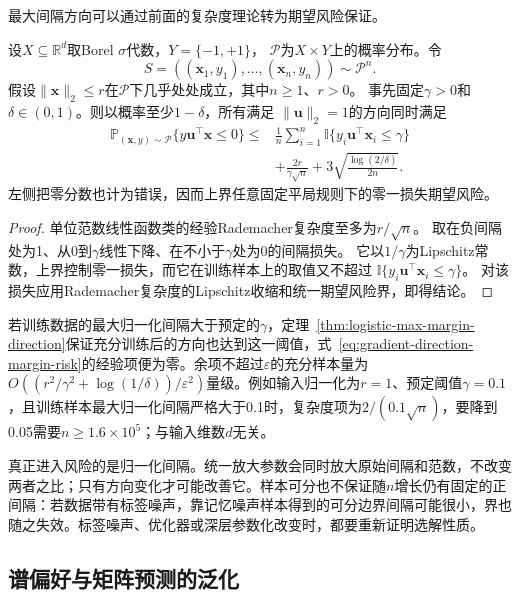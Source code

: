 最大间隔方向可以通过前面的复杂度理论转为期望风险保证。
\begin{theorem}[基于最大间隔的分类期望风险]
\label{thm:max-margin-classification-risk}
设$X\subseteq\mathbb R^d$取Borel $\sigma$代数，$Y=\{-1,+1\}$，
$\mathcal P$为$X\times Y$上的概率分布。令
\[
 S=((\bm x_1,y_1),\ldots,(\bm x_n,y_n))\sim\mathcal P^n.
\]
假设$\|\bm x\|_2\leq r$在$\mathcal P$下几乎处处成立，其中$n\geq1$、$r>0$。
事先固定$\gamma>0$和$\delta\in(0,1)$。则以概率至少$1-\delta$，所有满足
$\|\bm u\|_2=1$的方向同时满足
\begin{equation}
 \begin{aligned}
 \mathbb P_{(\bm x,y)\sim\mathcal P}\{y\bm u^\top\bm x\leq0\}
 \leq{}&\frac1n\sum_{i=1}^n
       \mathbb I\{y_i\bm u^\top\bm x_i\leq\gamma\}\\
 &+\frac{2r}{\gamma\sqrt n}
       +3\sqrt{\frac{\log(2/\delta)}{2n}}.
 \end{aligned}
 \label{eq:gradient-direction-margin-risk}
\end{equation}
左侧把零分数也计为错误，因而上界任意固定平局规则下的零一损失期望风险。
\end{theorem}
\begin{proof}
单位范数线性函数类的经验Rademacher复杂度至多为$r/\sqrt n$。
取在负间隔处为1、从0到$\gamma$线性下降、在不小于$\gamma$处为0的间隔损失。
它以$1/\gamma$为Lipschitz常数，上界控制零一损失，而它在训练样本上的取值又不超过
$\mathbb I\{y_i\bm u^\top\bm x_i\leq\gamma\}$。
对该损失应用Rademacher复杂度的Lipschitz收缩和统一期望风险界，即得结论。
\end{proof}

若训练数据的最大归一化间隔大于预定的$\gamma$，定理~\ref{thm:logistic-max-margin-direction}保证充分训练后的方向也达到这一阈值，式~\eqref{eq:gradient-direction-margin-risk}的经验项便为零。余项不超过$\varepsilon$的充分样本量为$O((r^2/\gamma^2+\log(1/\delta))/\varepsilon^2)$量级。例如输入归一化为$r=1$、预定阈值$\gamma=0.1$，且训练样本最大归一化间隔严格大于0.1时，复杂度项为$2/(0.1\sqrt n)$，要降到0.05需要$n\geq1.6\times10^5$；与输入维数$d$无关。

真正进入风险的是归一化间隔。统一放大参数会同时放大原始间隔和范数，不改变两者之比；只有方向变化才可能改善它。样本可分也不保证随$n$增长仍有固定的正间隔：若数据带有标签噪声，靠记忆噪声样本得到的可分边界间隔可能很小，界也随之失效。标签噪声、优化器或深层参数化改变时，都要重新证明选解性质。

\subsection{谱偏好与矩阵预测的泛化}

